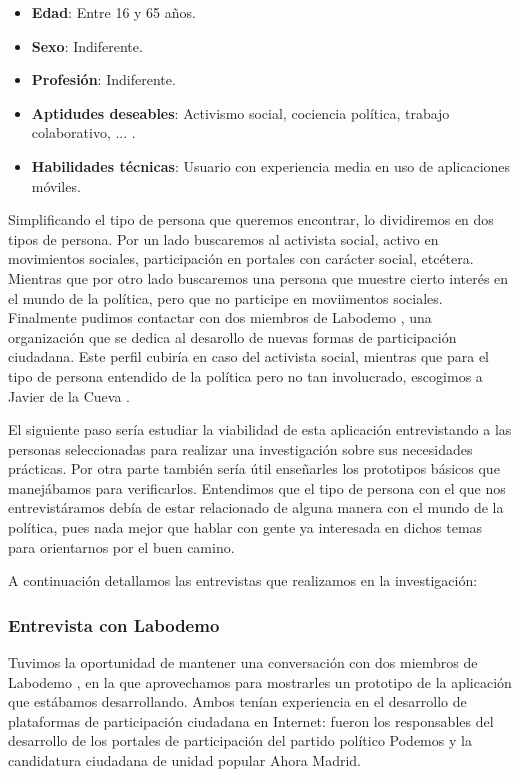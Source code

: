 \begin{itemize}
\item \textbf{Edad}: Entre 16 y 65 años.
\item \textbf{Sexo}: Indiferente.
\item \textbf{Profesión}: Indiferente.
\item \textbf{Aptidudes deseables}: Activismo social, cociencia política, trabajo colaborativo, ... .
\item \textbf{Habilidades técnicas}: Usuario con experiencia media en uso de aplicaciones móviles.
\end{itemize}

Simplificando el tipo de persona que queremos encontrar, lo dividiremos en dos tipos de persona. Por un lado buscaremos al activista social, activo en movimientos sociales, participación en portales con carácter social, etcétera. Mientras que por otro lado buscaremos una persona que muestre cierto interés en el mundo de la política, pero que no participe en moviimentos sociales. Finalmente pudimos contactar con dos miembros de Labodemo \cite{ref:labodemo}, una organización que se dedica al desarollo de nuevas formas de participación ciudadana. Este perfil cubiría en caso del activista social, mientras que para el tipo de persona entendido de la política pero no tan involucrado, escogimos a Javier de la Cueva \cite{ref:jdelacueva}.

El siguiente paso sería estudiar la viabilidad de esta aplicación entrevistando a las personas seleccionadas para realizar una investigación sobre sus necesidades prácticas. Por otra parte también sería útil enseñarles los prototipos básicos que manejábamos para verificarlos. Entendimos que el tipo de persona con el que nos entrevistáramos debía de estar relacionado de alguna manera con el mundo de la política, pues nada mejor que hablar con gente ya interesada en dichos temas para orientarnos por el buen camino.

A continuación detallamos las entrevistas que realizamos en la investigación:

\subsubsection{Entrevista con Labodemo}

Tuvimos la oportunidad de mantener una conversación con dos miembros de Labodemo \cite{ref:labodemo}, en la que aprovechamos para mostrarles un prototipo de la aplicación que estábamos desarrollando. Ambos tenían experiencia en el desarrollo de plataformas de participación ciudadana en Internet: fueron los responsables del desarrollo de los portales de participación del partido político Podemos y la candidatura ciudadana de unidad popular Ahora Madrid.

